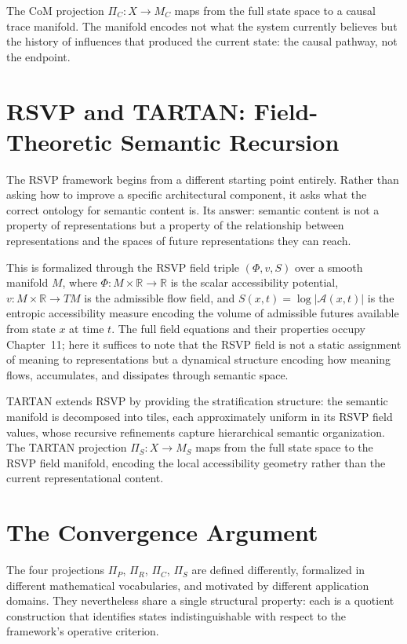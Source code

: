 \documentclass[12pt, oneside]{book}
\theoremstyle{flyxion}
\theoremstyle{definition}
\begin{document}
The CoM projection $\Pi_C : X \to M_C$ maps from the full state space
to a causal trace manifold. The manifold encodes not what the system
currently believes but the history of influences that produced the
current state: the causal pathway, not the endpoint.

\section{RSVP and TARTAN: Field-Theoretic Semantic Recursion}

The RSVP framework begins from a different starting point entirely.
Rather than asking how to improve a specific architectural component,
it asks what the correct ontology for semantic content is. Its answer:
semantic content is not a property of representations but a property
of the relationship between representations and the spaces of future
representations they can reach.

This is formalized through the RSVP field triple $(\Phi, v, S)$ over
a smooth manifold $M$, where $\Phi : M \times \mathbb{R} \to \mathbb{R}$
is the scalar accessibility potential, $v : M \times \mathbb{R} \to TM$
is the admissible flow field, and $S(x,t) = \log|\mathcal{A}(x,t)|$ is
the entropic accessibility measure encoding the volume of admissible
futures available from state $x$ at time $t$. The full field equations
and their properties occupy Chapter~11; here it suffices to note that
the RSVP field is not a static assignment of meaning to representations
but a dynamical structure encoding how meaning flows, accumulates, and
dissipates through semantic space.

TARTAN extends RSVP by providing the stratification structure:
the semantic manifold is decomposed into tiles, each approximately
uniform in its RSVP field values, whose recursive refinements capture
hierarchical semantic organization. The TARTAN projection
$\Pi_S : X \to M_S$ maps from the full state space to the RSVP field
manifold, encoding the local accessibility geometry rather than the
current representational content.

\section{The Convergence Argument}

The four projections $\Pi_P$, $\Pi_R$, $\Pi_C$, $\Pi_S$ are defined
differently, formalized in different mathematical vocabularies, and
motivated by different application domains. They nevertheless share
a single structural property: each is a quotient construction that
identifies states indistinguishable with respect to the framework's
operative criterion.
\end{document}
